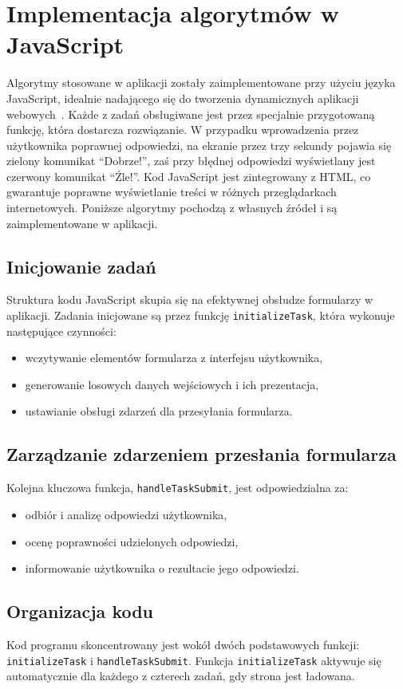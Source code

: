 \documentclass{SGGW-thesis}
\begin{document}
	\section{Implementacja algorytmów w JavaScript}
	Algorytmy stosowane w aplikacji zostały zaimplementowane przy użyciu języka JavaScript, idealnie nadającego się do tworzenia dynamicznych aplikacji webowych~\cite{jsksiazka}. Każde z zadań obsługiwane jest przez specjalnie przygotowaną funkcję, która dostarcza rozwiązanie. W przypadku wprowadzenia przez użytkownika poprawnej odpowiedzi, na ekranie przez trzy sekundy pojawia się zielony komunikat ``Dobrze!'', zaś przy błędnej odpowiedzi wyświetlany jest czerwony komunikat ``Źle!''. Kod JavaScript jest zintegrowany z HTML, co gwarantuje poprawne wyświetlanie treści w różnych przeglądarkach internetowych. Poniższe algorytmy pochodzą z własnych źródeł i są zaimplementowane w aplikacji.

	\subsection{Inicjowanie zadań}
	Struktura kodu JavaScript skupia się na efektywnej obsłudze formularzy w aplikacji. Zadania inicjowane są przez funkcję \texttt{initializeTask}, która wykonuje następujące czynności:
	\begin{itemize}
		\item wczytywanie elementów formularza z interfejsu użytkownika,
		\item generowanie losowych danych wejściowych i ich prezentacja,
		\item ustawianie obsługi zdarzeń dla przesyłania formularza.
	\end{itemize}
	\newpage
	
	\subsection{Zarządzanie zdarzeniem przesłania formularza}
	Kolejna kluczowa funkcja, \texttt{handleTaskSubmit}, jest odpowiedzialna za:
	\begin{itemize}
		\item odbiór i analizę odpowiedzi użytkownika,
		\item ocenę poprawności udzielonych odpowiedzi,
		\item informowanie użytkownika o rezultacie jego odpowiedzi.
	\end{itemize}
	\subsection{Organizacja kodu}
	Kod programu skoncentrowany jest wokół dwóch podstawowych funkcji: \texttt{initializeTask} i \texttt{handleTaskSubmit}. Funkcja \texttt{initializeTask} aktywuje się automatycznie dla każdego z czterech zadań, gdy strona jest ładowana.
\end{document}

